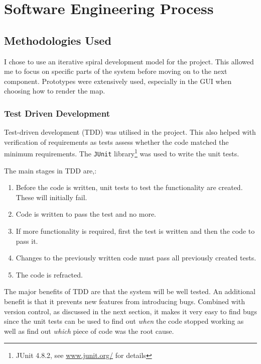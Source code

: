 \section{Software Engineering Process}

\subsection{Methodologies Used}
\label{sub:methodologies_used}

I chose to use an iterative spiral development model for the project. This allowed me to focus on specific parts of the system before moving on to the next component. 
Prototypes were extensively used, especially in the GUI when choosing how to render the map. %


\subsubsection{Test Driven Development}
Test-driven development (TDD) was utilised in the project. This also helped with verification of requirements as tests assess whether the code matched the minimum requirements. The \texttt{JUnit} library\footnote{JUnit 4.8.2, see \url{www.junit.org/} for details } was used to write the unit tests.  

The main stages in TDD are\cite{murphytest},\cite{desai2008survey}:
\begin{enumerate}[noitemsep ]
	\item Before the code is written, unit tests to test the functionality are created. These will initially fail.
   \item Code is written to pass the test and no more.
   \item If more functionality is required, first the test is written and then the code to pass it.
   \item Changes to the previously written code must pass all previously created tests.
   \item The code is refracted. 
\end{enumerate}

The major benefits of TDD are that the system will be well tested.  An additional benefit is that  it  prevents new features from introducing bugs. Combined with version control, as discussed in the next section, it makes it very easy to find bugs since the unit tests can be used to find out \emph{when} the code stopped working as well as find out \emph{which} piece of code was the root cause.

